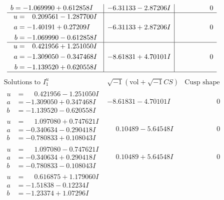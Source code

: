 \documentclass[1p]{elsarticle_modified}
\theoremstyle{definition}
\newcommand{\I}{\sqrt{-1}}
\begin{document}
$$\begin{array}{c|c|c}
\begin{aligned}
b &= -1.069990 + 0.612858 I\end{aligned}
 & -6.31133 - 2.87206 I & \phantom{-0.000000 } 0 \\ \hline\begin{aligned}
u &= \phantom{-}0.209561 - 1.287700 I \\
a &= -1.40191 + 0.27209 I \\
b &= -1.069990 - 0.612858 I\end{aligned}
 & -6.31133 + 2.87206 I & \phantom{-0.000000 } 0 \\ \hline\begin{aligned}
u &= \phantom{-}0.421956 + 1.251050 I \\
a &= -1.309050 - 0.347468 I \\
b &= -1.139520 + 0.620558 I\end{aligned}
 & -8.61831 + 4.70101 I & \phantom{-0.000000 } 0\\
 \hline 
 \end{array}$$\newpage$$\begin{array}{c|c|c}  
\text{Solutions to }I^u_{1}& \I (\text{vol} + \sqrt{-1}CS) & \text{Cusp shape}\\
 \hline 
\begin{aligned}
u &= \phantom{-}0.421956 - 1.251050 I \\
a &= -1.309050 + 0.347468 I \\
b &= -1.139520 - 0.620558 I\end{aligned}
 & -8.61831 - 4.70101 I & \phantom{-0.000000 } 0 \\ \hline\begin{aligned}
u &= \phantom{-}1.097080 + 0.747621 I \\
a &= -0.340634 - 0.290418 I \\
b &= -0.780833 + 0.108043 I\end{aligned}
 & \phantom{-}0.10489 - 5.64548 I & \phantom{-0.000000 } 0 \\ \hline\begin{aligned}
u &= \phantom{-}1.097080 - 0.747621 I \\
a &= -0.340634 + 0.290418 I \\
b &= -0.780833 - 0.108043 I\end{aligned}
 & \phantom{-}0.10489 + 5.64548 I & \phantom{-0.000000 } 0 \\ \hline\begin{aligned}
u &= \phantom{-}0.616875 + 1.179060 I \\
a &= -1.51838 - 0.12234 I \\
b &= -1.23374 + 1.07296 I\end{aligned}

\end{array}$$
\end{document}
